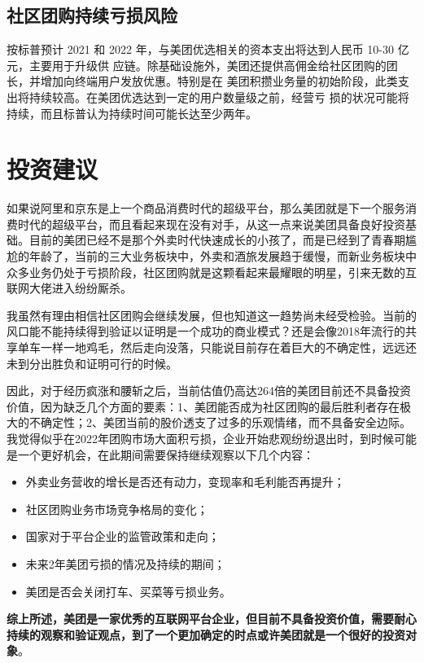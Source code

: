 \documentclass[UTF8,a4paper,12pt,lang=cn,fontset = windows]{elegantpaper} %
\begin{document}
\subsection{社区团购持续亏损风险}
按标普预计 2021 和 2022 年，与美团优选相关的资本支出将达到人民币 10-30 亿元，主要用于升级供
应链。除基础设施外，美团还提供高佣金给社区团购的团长，并增加向终端用户发放优惠。特别是在
美团积攒业务量的初始阶段，此类支出将持续较高。在美团优选达到一定的用户数量级之前，经营亏
损的状况可能将持续，而且标普认为持续时间可能长达至少两年。

\section{投资建议}
如果说阿里和京东是上一个商品消费时代的超级平台，那么美团就是下一个服务消费时代的超级平台，而且看起来现在没有对手，从这一点来说美团具备良好投资基础。目前的美团已经不是那个外卖时代快速成长的小孩了，而是已经到了青春期尴尬的年龄了，当前的三大业务板块中，外卖和酒旅发展趋于缓慢，而新业务板块中众多业务仍处于亏损阶段，社区团购就是这颗看起来最耀眼的明星，引来无数的互联网大佬进入纷纷厮杀。

我虽然有理由相信社区团购会继续发展，但也知道这一趋势尚未经受检验。当前的风口能不能持续得到验证以证明是一个成功的商业模式？还是会像2018年流行的共享单车一样一地鸡毛，然后走向没落，只能说目前存在着巨大的不确定性，远远还未到分出胜负和证明可行的时候。

因此，对于经历疯涨和腰斩之后，当前估值仍高达264倍的美团目前还不具备投资价值，因为缺乏几个方面的要素：1、美团能否成为社区团购的最后胜利者存在极大的不确定性；2、美团当前的股价透支了过多的乐观情绪，而不具备安全边际。我觉得似乎在2022年团购市场大面积亏损，企业开始悲观纷纷退出时，到时候可能是一个更好机会，在此期间需要保持继续观察以下几个内容：
\begin{itemize}
  \item 外卖业务营收的增长是否还有动力，变现率和毛利能否再提升；
  \item 社区团购业务市场竞争格局的变化；
  \item 国家对于平台企业的监管政策和走向；
  \item 未来2年美团亏损的情况及持续的期间；
  \item 美团是否会关闭打车、买菜等亏损业务。
  \end{itemize}

\textbf{综上所述，美团是一家优秀的互联网平台企业，但目前不具备投资价值，需要耐心持续的观察和验证观点，到了一个更加确定的时点或许美团就是一个很好的投资对象}。
\end{document}
